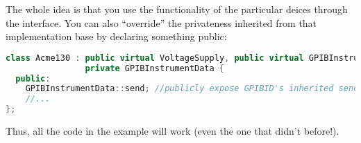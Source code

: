 The whole idea is that you use the functionality of the particular deices through the interface. You can also ``override'' the privateness inherited from that implementation base by declaring something public:

\begin{lstlisting}[language=C++]
class Acme130 : public virtual VoltageSupply, public virtual GPIBInstrument,
                private GPIBInstrumentData {
  public:
    GPIBInstrumentData::send; //publicly expose GPIBID's inherited send function
    //...
};
\end{lstlisting}

Thus, all the code in the example will work (even the one that didn't before!).